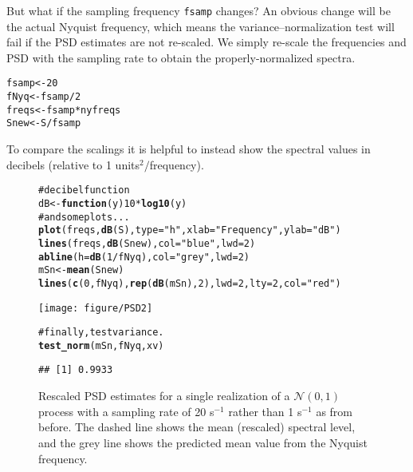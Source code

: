 \documentclass[12pt]{article}\usepackage{graphicx, color}
\makeatletter
\def\maxwidth{ %
  \ifdim\Gin@nat@width>\linewidth
    \linewidth
  \else
    \Gin@nat@width
  \fi
}
\newcommand{\hlfunctioncall}[1]{\textcolor[rgb]{0.501960784313725,0,0.329411764705882}{\textbf{#1}}}%
\newcommand{\hlstring}[1]{\textcolor[rgb]{0.6,0.6,1}{#1}}%
\newcommand{\hlcomment}[1]{\textcolor[rgb]{0.180392156862745,0.6,0.341176470588235}{#1}}%
\newenvironment{kframe}{%
 \def\at@end@of@kframe{}%
 \ifinner\ifhmode%
  \def\at@end@of@kframe{\end{minipage}}%
  \begin{minipage}{\columnwidth}%
 \fi\fi%
 \def\FrameCommand##1{\hskip\@totalleftmargin \hskip-\fboxsep
 \colorbox{shadecolor}{##1}\hskip-\fboxsep
     \hskip-\linewidth \hskip-\@totalleftmargin \hskip\columnwidth}%
 \MakeFramed {\advance\hsize-\width
   \@totalleftmargin\z@ \linewidth\hsize
   \@setminipage}}%
 {\par\unskip\endMakeFramed%
 \at@end@of@kframe}
\newenvironment{knitrout}{}{} %
\makeatother
\begin{document}
But what if the sampling frequency \texttt{fsamp} changes? An obvious change will be
the actual Nyquist frequency, which means the variance--normalization test will
fail if the PSD estimates are not re-scaled.  We simply re-scale the frequencies
and PSD
with the sampling rate
to obtain the properly-normalized spectra.

\begin{knitrout}
\color{fgcolor}\begin{kframe}
\begin{alltt}
fsamp <- 20
fNyq <- fsamp/2
freqs <- fsamp * nyfreqs
Snew <- S/fsamp
\end{alltt}
\end{kframe}
\end{knitrout}


To compare the scalings it is helpful to instead show the spectral values
in decibels (relative to 1 units$^2/$frequency).
\begin{figure}[htb!]
\begin{center}
\begin{knitrout}
\color{fgcolor}\begin{kframe}
\begin{alltt}
\hlcomment{# decibel function}
dB <- \hlfunctioncall{function}(y) 10 * \hlfunctioncall{log10}(y)
\hlcomment{# and some plots...}
\hlfunctioncall{plot}(freqs, \hlfunctioncall{dB}(S), type = \hlstring{"h"}, xlab = \hlstring{"Frequency"}, ylab = \hlstring{"dB"})
\hlfunctioncall{lines}(freqs, \hlfunctioncall{dB}(Snew), col = \hlstring{"blue"}, lwd = 2)
\hlfunctioncall{abline}(h = \hlfunctioncall{dB}(1/fNyq), col = \hlstring{"grey"}, lwd = 2)
mSn <- \hlfunctioncall{mean}(Snew)
\hlfunctioncall{lines}(\hlfunctioncall{c}(0, fNyq), \hlfunctioncall{rep}(\hlfunctioncall{dB}(mSn), 2), lwd = 2, lty = 2, col = \hlstring{"red"})
\end{alltt}
\end{kframe}
\texttt{[image: figure/PSD2]} 
\begin{kframe}\begin{alltt}
\hlcomment{# finally, test variance.}
\hlfunctioncall{test_norm}(mSn, fNyq, xv)
\end{alltt}
\begin{verbatim}
## [1] 0.9933
\end{verbatim}
\end{kframe}
\end{knitrout}

\label{fig:psdsamp}
\caption{Rescaled PSD estimates for a single realization of a 
$\mathcal{N}(0,1)$ process with a sampling rate of 20 s$^{-1}$ rather
than 1 s$^{-1}$ as from before.  
The dashed line shows the mean (rescaled) spectral level, and the
grey line shows the predicted mean value from the Nyquist
frequency.}
\end{center}
\end{figure}
\end{document}
